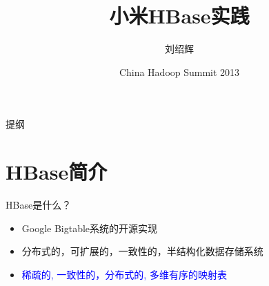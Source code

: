 \documentclass[xcolor=table]{beamer}
\begin{document}
\begin{CJK}{UTF8}{gkai}

\title[刘绍辉]{小米HBase实践}
\author{刘绍辉}
\date{China Hadoop Summit 2013}


\begin{frame}[plain]
  \titlepage
\end{frame}


\begin{frame}{提纲}
  \tableofcontents[hideallsubsections]
\end{frame}


\section{HBase简介}
\begin{frame}{HBase是什么？}
\begin{itemize}
	\item \textcolor{dgreen}{Google Bigtable系统的开源实现}
	\item	分布式的，可扩展的，一致性的，半结构化数据存储系统
	\item \textcolor{blue}{稀疏的, 一致性的，分布式的, 多维有序的映射表} 
\end{itemize}
\end{frame}


\end{CJK}
\end{document}
